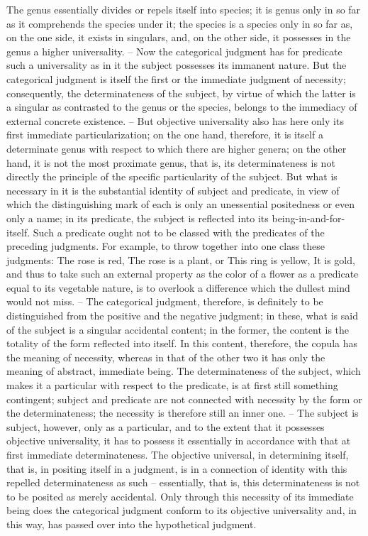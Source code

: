 The genus essentially divides or repels itself into species; it is genus only
in so far as it comprehends the species under it; the species is a species
only in so far as, on the one side, it exists in singulars, and, on the other
side, it possesses in the genus a higher universality. – Now the categorical
judgment has for predicate such a universality as in it the subject possesses
its immanent nature. But the categorical judgment is itself the first or
the immediate judgment of necessity; consequently, the determinateness
of the subject, by virtue of which the latter is a singular as contrasted to
the genus or the species, belongs to the immediacy of external concrete
existence. – But objective universality also has here only its first immediate
particularization; on the one hand, therefore, it is itself a determinate genus
with respect to which there are higher genera; on the other hand, it is not
the most proximate genus, that is, its determinateness is not directly the
principle of the specific particularity of the subject. But what is necessary in
it is the substantial identity of subject and predicate, in view of which the
distinguishing mark of each is only an unessential positedness or even only
a name; in its predicate, the subject is reflected into its being-in-and-for-
itself. Such a predicate ought not to be classed with the predicates of the
preceding judgments. For example, to throw together into one class these
judgments:
The rose is red,
The rose is a plant,
or This ring is yellow,
It is gold,
and thus to take such an external property as the color of a flower as a
predicate equal to its vegetable nature, is to overlook a difference which
the dullest mind would not miss. – The categorical judgment, therefore, is
definitely to be distinguished from the positive and the negative judgment;
in these, what is said of the subject is a singular accidental content; in the
former, the content is the totality of the form reflected into itself. In this
content, therefore, the copula has the meaning of necessity, whereas in that
of the other two it has only the meaning of abstract, immediate being.
The determinateness of the subject, which makes it a particular with
respect to the predicate, is at first still something contingent; subject and
predicate are not connected with necessity by the form or the determinateness;
the necessity is therefore still an inner one. – The subject is subject, however,
only as a particular, and to the extent that it possesses objective universality,
it has to possess it essentially in accordance with that at first immediate
determinateness. The objective universal, in determining itself, that is, in
positing itself in a judgment, is in a connection of identity with this repelled
determinateness as such – essentially, that is, this determinateness is not to
be posited as merely accidental. Only through this necessity of its immediate
being does the categorical judgment conform to its objective universality
and, in this way, has passed over into the hypothetical judgment.

